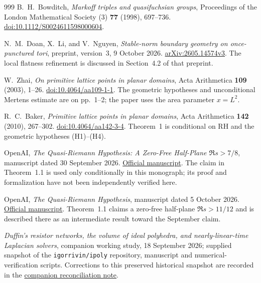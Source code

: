 \documentclass[11pt,a4paper]{article}
\numberwithin{equation}{section}
\theoremstyle{definition}
\theoremstyle{remark}
\begin{document}
\begin{thebibliography}{999}
B.~H.~Bowditch,
\emph{Markoff triples and quasifuchsian groups},
Proceedings of the London Mathematical Society (3) \textbf{77} (1998), 697--736.
\href{https://doi.org/10.1112/S0024611598000604}{doi:10.1112/S0024611598000604}.

N.~M.~Doan, X.~Li, and V.~Nguyen,
\emph{Stable-norm boundary geometry on once-punctured tori},
preprint, version~3, 9 October 2026.
\href{https://arxiv.org/abs/2605.14574v3}{arXiv:2605.14574v3}.
The local flatness refinement is discussed in Section~4.2 of that preprint.


W.~Zhai,
\emph{On primitive lattice points in planar domains},
Acta Arithmetica \textbf{109} (2003), 1--26.
\href{https://doi.org/10.4064/aa109-1-1}{doi:10.4064/aa109-1-1}.
The geometric hypotheses and unconditional Mertens estimate are on
pp.~1--2; the paper uses the area parameter $x=L^2$.

R.~C.~Baker,
\emph{Primitive lattice points in planar domains},
Acta Arithmetica \textbf{142} (2010), 267--302.
\href{https://doi.org/10.4064/aa142-3-4}{doi:10.4064/aa142-3-4}.
Theorem~1 is conditional on RH and the geometric hypotheses (H1)--(H4).

OpenAI,
\emph{The Quasi-Riemann Hypothesis: A Zero-Free Half-Plane
$\Re s>7/8$}, manuscript dated 30 September 2026.
\href{https://github.com/openai/math/blob/main/preprints/The-Quasi-Riemann-Hypothesis-September-30-2026/paper.pdf}{Official manuscript}.
The claim in Theorem~1.1 is used only conditionally in this monograph;
its proof and formalization have not been independently verified here.

OpenAI,
\emph{The Quasi-Riemann Hypothesis}, manuscript dated 5 October 2026.
\href{https://github.com/openai/math/blob/main/preprints/The-Quasi-Riemann-Hypothesis-October-5-2026/paper2.pdf}{Official manuscript}.
Theorem~1.1 claims a zero-free half-plane $\Re s>11/12$ and is
described there as an intermediate result toward the September claim.


\emph{Duffin's resistor networks, the volume of ideal polyhedra, and
nearly-linear-time Laplacian solvers}, companion working study,
18 September 2026; supplied snapshot of the \texttt{igorrivin/ipoly}
repository, manuscript and numerical-verification scripts.
Corrections to this preserved historical snapshot are recorded in the
\href{companion-reconciliation.md}{companion reconciliation note}.


\end{thebibliography}
\end{document}
